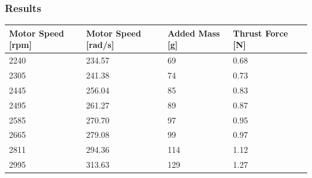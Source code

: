 \subsubsection{Results}
\begin{table}[H]
	\centering
	\begin{tabular}{|l|l|l|l|p{4.3cm}|}
		\hline%
		\textbf{Motor Speed [rpm]}    & \textbf{Motor Speed [rad/s]} & \textbf{Added Mass [g]}  & \textbf{Thrust Force [N]} \\ 
		\hline%
		2240                        	   &  234.57                           & 69                       & 0.68         \\
		\hline%
		2305 						       &  241.38				           & 74                       & 0.73         \\
		\hline%
		2445                               &  256.04   			               & 85                       & 0.83         \\
		\hline%
		2495                               &  261.27			               & 89                       & 0.87         \\
		\hline%
		2585                               &  270.70                          & 97                       & 0.95         \\
		\hline%
		2665 						       &  279.08			           & 99                       & 0.97         \\
		\hline%
		2811                               &  294.36   			           & 114                      & 1.12         \\
		\hline%
		2995                               &  313.63                          & 129                      & 1.27         \\

\end{tabular}
\end{table}
